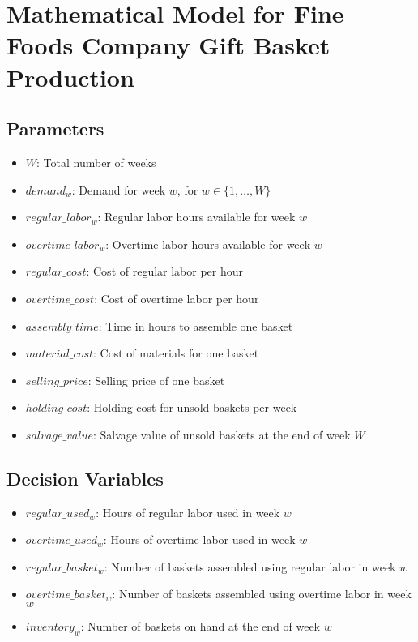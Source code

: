 \documentclass{article}
\begin{document}
\section*{Mathematical Model for Fine Foods Company Gift Basket Production}

\subsection*{Parameters}

\begin{itemize}
    \item $W$: Total number of weeks
    \item $demand_w$: Demand for week $w$, for $w \in \{1, \ldots, W\}$
    \item $regular\_labor_w$: Regular labor hours available for week $w$
    \item $overtime\_labor_w$: Overtime labor hours available for week $w$
    \item $regular\_cost$: Cost of regular labor per hour
    \item $overtime\_cost$: Cost of overtime labor per hour
    \item $assembly\_time$: Time in hours to assemble one basket
    \item $material\_cost$: Cost of materials for one basket
    \item $selling\_price$: Selling price of one basket
    \item $holding\_cost$: Holding cost for unsold baskets per week
    \item $salvage\_value$: Salvage value of unsold baskets at the end of week $W$
\end{itemize}

\subsection*{Decision Variables}

\begin{itemize}
    \item $regular\_used_w$: Hours of regular labor used in week $w$
    \item $overtime\_used_w$: Hours of overtime labor used in week $w$
    \item $regular\_basket_w$: Number of baskets assembled using regular labor in week $w$
    \item $overtime\_basket_w$: Number of baskets assembled using overtime labor in week $w$
    \item $inventory_w$: Number of baskets on hand at the end of week $w$
\end{itemize}
\end{document}
